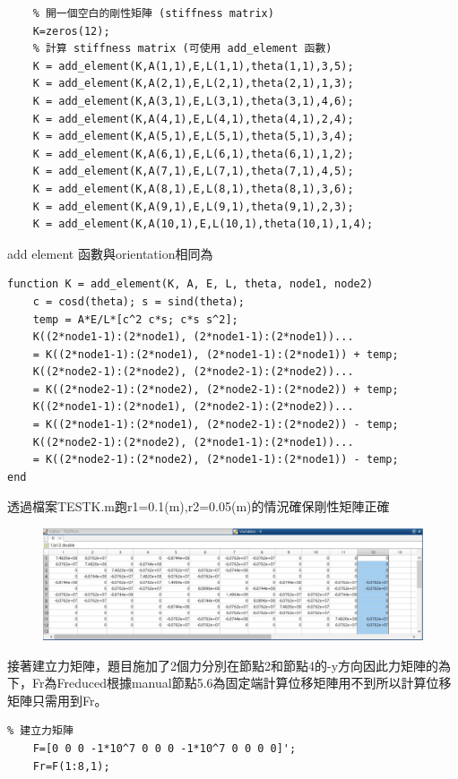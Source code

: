 \documentclass[12pt]{article}
\begin{document}
\begin{CJK}{UTF8}{bkai}
\begin{lstlisting}   
    % 開一個空白的剛性矩陣 (stiffness matrix)
    K=zeros(12);
    % 計算 stiffness matrix (可使用 add_element 函數)
    K = add_element(K,A(1,1),E,L(1,1),theta(1,1),3,5);
    K = add_element(K,A(2,1),E,L(2,1),theta(2,1),1,3);
    K = add_element(K,A(3,1),E,L(3,1),theta(3,1),4,6);
    K = add_element(K,A(4,1),E,L(4,1),theta(4,1),2,4);
    K = add_element(K,A(5,1),E,L(5,1),theta(5,1),3,4);
    K = add_element(K,A(6,1),E,L(6,1),theta(6,1),1,2);
    K = add_element(K,A(7,1),E,L(7,1),theta(7,1),4,5);
    K = add_element(K,A(8,1),E,L(8,1),theta(8,1),3,6);
    K = add_element(K,A(9,1),E,L(9,1),theta(9,1),2,3);
    K = add_element(K,A(10,1),E,L(10,1),theta(10,1),1,4);
\end{lstlisting}
add element 函數與orientation相同為
\begin{lstlisting}
function K = add_element(K, A, E, L, theta, node1, node2)
    c = cosd(theta); s = sind(theta);
    temp = A*E/L*[c^2 c*s; c*s s^2];
    K((2*node1-1):(2*node1), (2*node1-1):(2*node1))...
    = K((2*node1-1):(2*node1), (2*node1-1):(2*node1)) + temp;
    K((2*node2-1):(2*node2), (2*node2-1):(2*node2))...
    = K((2*node2-1):(2*node2), (2*node2-1):(2*node2)) + temp;
    K((2*node1-1):(2*node1), (2*node2-1):(2*node2))...
    = K((2*node1-1):(2*node1), (2*node2-1):(2*node2)) - temp;
    K((2*node2-1):(2*node2), (2*node1-1):(2*node1))...
    = K((2*node2-1):(2*node2), (2*node1-1):(2*node1)) - temp;
end
\end{lstlisting}

透過檔案TESTK.m跑r1=0.1(m),r2=0.05(m)的情況確保剛性矩陣正確\\
\begin{figure}[h]
\includegraphics[scale=0.5]{./graph/KTEST.jpg}
\end{figure}

接著建立力矩陣，題目施加了2個力分別在節點2和節點4的-y方向因此力矩陣的為下，Fr為Freduced根據manual節點5.6為固定端計算位移矩陣用不到所以計算位移矩陣只需用到Fr。
\begin{lstlisting}
% 建立力矩陣
	F=[0 0 0 -1*10^7 0 0 0 -1*10^7 0 0 0 0]';
    Fr=F(1:8,1);
\end{lstlisting}


\end{CJK}
\end{document}
